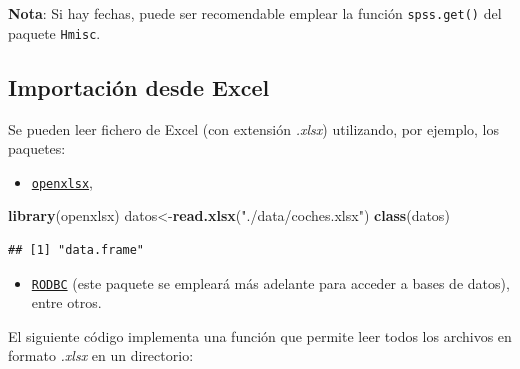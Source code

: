 \documentclass[
]{book}
\newenvironment{Shaded}{\begin{snugshade}}{\end{snugshade}}
\newcommand{\FunctionTok}[1]{\textcolor[rgb]{0.13,0.29,0.53}{\textbf{#1}}}
\newcommand{\NormalTok}[1]{#1}
\newcommand{\OtherTok}[1]{\textcolor[rgb]{0.56,0.35,0.01}{#1}}
\newcommand{\StringTok}[1]{\textcolor[rgb]{0.31,0.60,0.02}{#1}}
\providecommand{\tightlist}{%
  \setlength{\itemsep}{0pt}\setlength{\parskip}{0pt}}
\theoremstyle{break}
\theoremstyle{nonumberplain}
\begin{document}
\normalsize

\textbf{Nota}: Si hay fechas, puede ser recomendable emplear la función \texttt{spss.get()} del paquete \texttt{Hmisc}.

\subsection{Importación desde Excel}\label{importaciuxf3n-desde-excel}

Se pueden leer fichero de Excel (con extensión \emph{.xlsx}) utilizando, por ejemplo, los paquetes:

\begin{itemize}
\tightlist
\item
  \href{https://cran.r-project.org/web/packages/openxlsx/index.html}{\texttt{openxlsx}},
\end{itemize}

\begin{Shaded}
\begin{Highlighting}[]
\FunctionTok{library}\NormalTok{(openxlsx)}
\NormalTok{datos}\OtherTok{\textless{}{-}}\FunctionTok{read.xlsx}\NormalTok{(}\StringTok{"./data/coches.xlsx"}\NormalTok{)}
\FunctionTok{class}\NormalTok{(datos)}
\end{Highlighting}
\end{Shaded}

\begin{verbatim}
## [1] "data.frame"
\end{verbatim}

\begin{itemize}
\tightlist
\item
  \href{https://cran.r-project.org/web/packages/RODBC/index.html}{\texttt{RODBC}} (este paquete se empleará más adelante para acceder a bases de datos),
  entre otros.
\end{itemize}

El siguiente código implementa una función que permite leer todos
los archivos en formato \emph{.xlsx} en un directorio:
\end{document}
